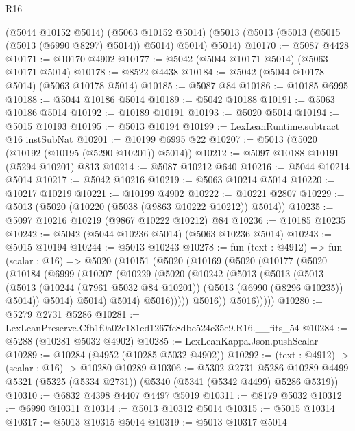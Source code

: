\begin{lexlean}{R16}
\begin{coremodule}
    (@5044 @10152 @5014)
    (@5063 @10152 @5014)
    (@5013 (@5013 (@5013 (@5015 (@5013 (@6990 @8297) @5014)) @5014) @5014) @5014)
@10170 := @5087 @4428
@10171 := @10170 @4902
@10177 := @5042 (@5044 @10171 @5014) (@5063 @10171 @5014)
@10178 := @8522 @4438
@10184 := @5042 (@5044 @10178 @5014) (@5063 @10178 @5014)
@10185 := @5087 @84
@10186 := @10185 @6995
@10188 := @5044 @10186 @5014
@10189 := @5042 @10188
@10191 := @5063 @10186 @5014
@10192 := @10189 @10191
@10193 := @5020 @5014
@10194 := @5015 @10193
@10195 := @5013 @10194
@10199 := LexLeanRuntime.subtract @16 instSubNat
@10201 := @10199 @6995 @22
@10207 := @5013 (@5020 (@10192 (@10195 (@5290 @10201)) @5014))
@10212 := @5097 @10188 @10191 (@5294 @10201) @813
@10214 := @5087 @10212 @640
@10216 := @5044 @10214 @5014
@10217 := @5042 @10216
@10219 := @5063 @10214 @5014
@10220 := @10217 @10219
@10221 := @10199 @4902
@10222 := @10221 @2807
@10229 := @5013 (@5020 (@10220 (@5038 (@9863 @10222 @10212)) @5014))
@10235 := @5097 @10216 @10219 (@9867 @10222 @10212) @84
@10236 := @10185 @10235
@10242 := @5042 (@5044 @10236 @5014) (@5063 @10236 @5014)
@10243 := @5015 @10194
@10244 := @5013 @10243
@10278 := fun (text : @4912) =>
  fun (scalar : @16) =>
  @5020
    (@10151
      (@5020
        (@10169
          (@5020
            (@10177
              (@5020
                (@10184
                  (@6999
                    (@10207
                      (@10229
                        (@5020
                          (@10242
                            (@5013
                              (@5013
                                (@5013
                                  (@5013
                                    (@10244 (@7961 @5032 @84 @10201))
                                    (@5013 (@6990 (@8296 @10235)) @5014))
                                  @5014)
                                @5014)
                              @5014)
                            @5016)))))
                  @5016))
              @5016)))))
@10280 := @5279 @2731 @5286
@10281 := LexLeanPreserve.Cfb1f0a02e181ed1267fc8dbc524c35e9.R16.__fits_54
@10284 := @5288 (@10281 @5032 @4902)
@10285 := LexLeanKappa.Json.pushScalar
@10289 := @10284 (@4952 (@10285 @5032 @4902))
@10292 := (text : @4912) -> (scalar : @16) -> @10280 @10289
@10306 := @5302
    @2731
    @5286
    @10289
    @4499
    @5321
    (@5325 (@5334 @2731))
    (@5340 (@5341 (@5342 @4499) @5286 @5319))
@10310 := @6832 @4398 @4407 @4497 @5019
@10311 := @8179 @5032
@10312 := @6990 @10311
@10314 := @5013 @10312 @5014
@10315 := @5015 @10314
@10317 := @5013 @10315 @5014
@10319 := @5013 @10317 @5014

\end{coremodule}
\end{lexlean}
